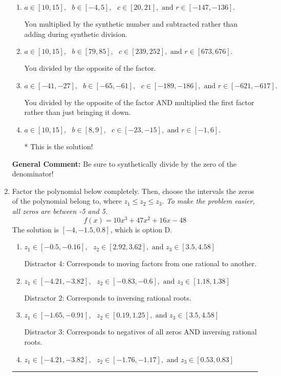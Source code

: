 \documentclass{extbook}[14pt]
\newcommand{\litem}[1]{\item #1

\rule{\textwidth}{0.4pt}}
\begin{document}
\begin{enumerate}
{\begin{enumerate}[label=\Alph*.]
 You multiplied by the synthetic number rather than bringing the first factor down.
\item \( a \in [10, 15], \text{   } b \in [-4, 5], \text{   } c \in [20, 21], \text{   and   } r \in [-147, -136]. \)

 You multiplied by the synthetic number and subtracted rather than adding during synthetic division.
\item \( a \in [10, 15], \text{   } b \in [79, 85], \text{   } c \in [239, 252], \text{   and   } r \in [673, 676]. \)

 You divided by the opposite of the factor.
\item \( a \in [-41, -27], \text{   } b \in [-65, -61], \text{   } c \in [-189, -186], \text{   and   } r \in [-621, -617]. \)

 You divided by the opposite of the factor AND multiplied the first factor rather than just bringing it down.
\item \( a \in [10, 15], \text{   } b \in [8, 9], \text{   } c \in [-23, -15], \text{   and   } r \in [-1, 6]. \)

* This is the solution!
\end{enumerate}

\textbf{General Comment:} Be sure to synthetically divide by the zero of the denominator!
}
\litem{
Factor the polynomial below completely. Then, choose the intervals the zeros of the polynomial belong to, where $z_1 \leq z_2 \leq z_3$. \textit{To make the problem easier, all zeros are between -5 and 5.}
\[ f(x) = 10x^{3} +47 x^{2} +16 x -48 \]The solution is \( [-4, -1.5, 0.8] \), which is option D.\begin{enumerate}[label=\Alph*.]
\item \( z_1 \in [-0.5, -0.16], \text{   }  z_2 \in [2.92, 3.62], \text{   and   } z_3 \in [3.5, 4.58] \)

 Distractor 4: Corresponds to moving factors from one rational to another.
\item \( z_1 \in [-4.21, -3.82], \text{   }  z_2 \in [-0.83, -0.6], \text{   and   } z_3 \in [1.18, 1.38] \)

 Distractor 2: Corresponds to inversing rational roots.
\item \( z_1 \in [-1.65, -0.91], \text{   }  z_2 \in [0.19, 1.25], \text{   and   } z_3 \in [3.5, 4.58] \)

 Distractor 3: Corresponds to negatives of all zeros AND inversing rational roots.
\item \( z_1 \in [-4.21, -3.82], \text{   }  z_2 \in [-1.76, -1.17], \text{   and   } z_3 \in [0.53, 0.83] \)


\end{enumerate}}
\end{enumerate}
\end{document}
